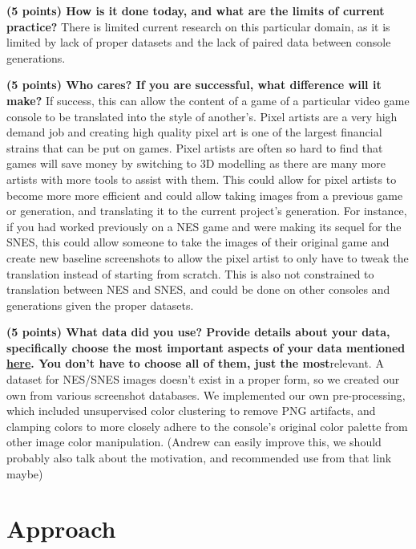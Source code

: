 \documentclass[10pt,twocolumn,letterpaper]{article}
\begin{document}
\textbf{(5 points) How is it done today, and what are the limits of current practice?}
There is limited current research on this particular domain, as it is limited by lack of proper datasets and the lack of paired data between console generations.

\textbf{(5 points) Who cares? If you are successful, what difference will it make?}
If success, this can allow the content of a game of a particular video game console to be translated into the style of another's. Pixel artists are a very high demand job and creating high quality pixel art is one of the largest financial strains that can be put on games. Pixel artists are often so hard to find that games will save money by switching to 3D modelling as there are many more artists with more tools to assist with them. This could allow for pixel artists to become more more efficient and could allow taking images from a previous game or generation, and translating it to the current project's generation. For instance, if you had worked previously on a NES game and were making its sequel for the SNES, this could allow someone to take the images of their original game and create new baseline screenshots to allow the pixel artist to only have to tweak the translation instead of starting from scratch. This is also not constrained to translation between NES and SNES, and could be done on other consoles and generations given the proper datasets.

\textbf{(5 points) What data did you use? Provide details about your data, specifically choose the most important aspects of your data mentioned \href{https://arxiv.org/abs/1803.09010}{here}. You don’t have to choose all of them, just the most}relevant.
A dataset for NES/SNES images doesn't exist in a proper form, so we created our own from various screenshot databases. We implemented our own pre-processing, which included unsupervised color clustering to remove PNG artifacts, and clamping colors to more closely adhere to the console's original color palette from other image color manipulation. (Andrew can easily improve this, we should probably also talk about the motivation, and recommended use from that link maybe)

\section{Approach}
\end{document}
